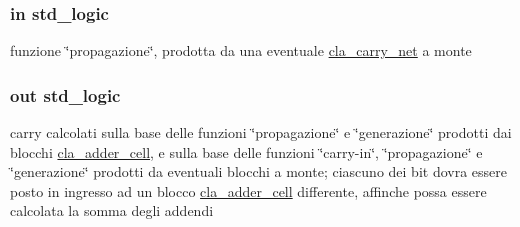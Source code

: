 \subsubsection[{\texorpdfstring{propin}{propin}}]{ {\bfseries \textcolor{vhdlchar}{in}\textcolor{vhdlchar}{ }} {\bfseries \textcolor{vhdlchar}{std\+\_\+logic}\textcolor{vhdlchar}{ }} \hspace{0.3cm}{\ttfamily [Port]}}\hypertarget{group___carry_network_ga422e8e7ee01fc7ac7b7390cd2ad8c87b}{}\label{group___carry_network_ga422e8e7ee01fc7ac7b7390cd2ad8c87b}


funzione \char`\"{}propagazione\char`\"{}, prodotta da una eventuale \hyperlink{classcla__carry__net}{cla\+\_\+carry\+\_\+net} a monte 

\subsubsection[{\texorpdfstring{propout}{propout}}]{ {\bfseries \textcolor{vhdlchar}{out}\textcolor{vhdlchar}{ }} {\bfseries \textcolor{vhdlchar}{std\+\_\+logic}\textcolor{vhdlchar}{ }} \hspace{0.3cm}{\ttfamily [Port]}}\hypertarget{group___carry_network_ga5957c9cdd706cafd2da8855133a002c9}{}\label{group___carry_network_ga5957c9cdd706cafd2da8855133a002c9}
carry calcolati sulla base delle funzioni \char`\"{}propagazione\char`\"{} e \char`\"{}generazione\char`\"{} prodotti dai blocchi \hyperlink{classcla__adder__cell}{cla\+\_\+adder\+\_\+cell}, e sulla base delle funzioni \char`\"{}carry-\/in\char`\"{}, \char`\"{}propagazione\char`\"{} e \char`\"{}generazione\char`\"{} prodotti da eventuali blocchi a monte; ciascuno dei bit dovra\textquotesingle{} essere posto in ingresso ad un blocco \hyperlink{classcla__adder__cell}{cla\+\_\+adder\+\_\+cell} differente, affinche\textquotesingle{} possa essere calcolata la somma degli addendi 